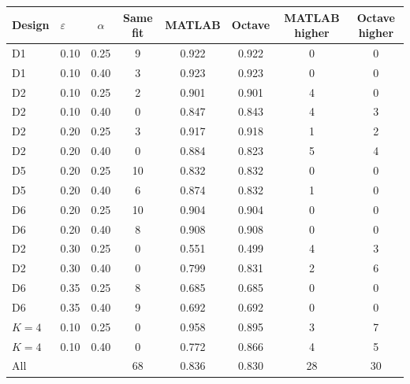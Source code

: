 \begin{tabular}{llcccccc}
\toprule
Design & $\varepsilon$ & $\alpha$ & Same fit & MATLAB & Octave & MATLAB higher & Octave higher \\
\midrule
D1 & 0.10 & 0.25 & 9 & 0.922 & 0.922 & 0 & 0 \\
D1 & 0.10 & 0.40 & 3 & 0.923 & 0.923 & 0 & 0 \\
D2 & 0.10 & 0.25 & 2 & 0.901 & 0.901 & 4 & 0 \\
D2 & 0.10 & 0.40 & 0 & 0.847 & 0.843 & 4 & 3 \\
D2 & 0.20 & 0.25 & 3 & 0.917 & 0.918 & 1 & 2 \\
D2 & 0.20 & 0.40 & 0 & 0.884 & 0.823 & 5 & 4 \\
D5 & 0.20 & 0.25 & 10 & 0.832 & 0.832 & 0 & 0 \\
D5 & 0.20 & 0.40 & 6 & 0.874 & 0.832 & 1 & 0 \\
D6 & 0.20 & 0.25 & 10 & 0.904 & 0.904 & 0 & 0 \\
D6 & 0.20 & 0.40 & 8 & 0.908 & 0.908 & 0 & 0 \\
D2 & 0.30 & 0.25 & 0 & 0.551 & 0.499 & 4 & 3 \\
D2 & 0.30 & 0.40 & 0 & 0.799 & 0.831 & 2 & 6 \\
D6 & 0.35 & 0.25 & 8 & 0.685 & 0.685 & 0 & 0 \\
D6 & 0.35 & 0.40 & 9 & 0.692 & 0.692 & 0 & 0 \\
$K=4$ & 0.10 & 0.25 & 0 & 0.958 & 0.895 & 3 & 7 \\
$K=4$ & 0.10 & 0.40 & 0 & 0.772 & 0.866 & 4 & 5 \\
\midrule
All & & & 68 & 0.836 & 0.830 & 28 & 30 \\
\bottomrule
\end{tabular}
